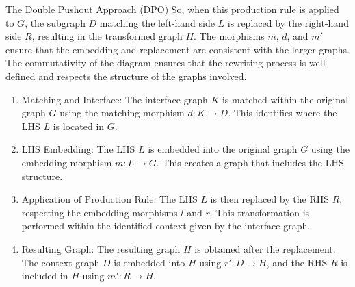 \begin{definition}{The Double Pushout Approach (DPO)}
	So, when this production rule is applied to \(G\), the subgraph \(D\) matching the left-hand side \(L\) is replaced by the right-hand side \(R\), resulting in the transformed graph \(H\). The morphisms \(m\), \(d\), and \(m'\) ensure that the embedding and replacement are consistent with the larger graphs. The commutativity of the diagram ensures that the rewriting process is well-defined and respects the structure of the graphs involved.
	
	\begin{enumerate}
		\item Matching and Interface: The interface graph $K$ is matched within the original graph $G$ using the matching morphism $d: K \to D$. This identifies where the LHS $L$ is located in $G$.
		
		\item LHS Embedding: The LHS $L$ is embedded into the original graph $G$ using the embedding morphism $m: L \to G$. This creates a graph that includes the LHS structure.
		
		\item Application of Production Rule: The LHS $L$ is then replaced by the RHS $R$, respecting the embedding morphisms $l$ and $r$. This transformation is performed within the identified context given by the interface graph.
		
		\item Resulting Graph: The resulting graph $H$ is obtained after the replacement. The context graph $D$ is embedded into $H$ using $r': D \to H$, and the RHS $R$ is included in $H$ using $m': R \to H$.
	\end{enumerate}
\end{definition}

